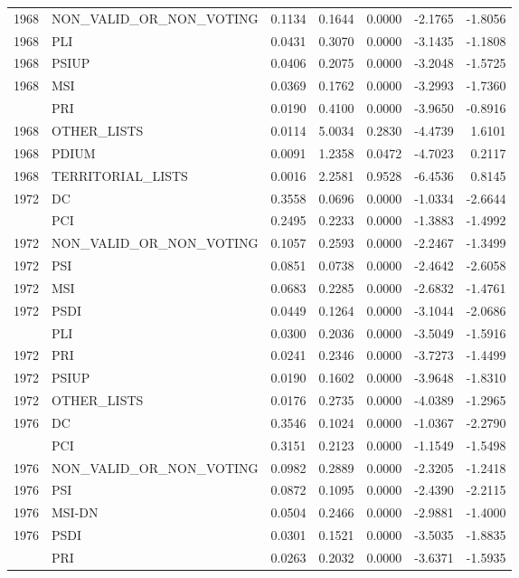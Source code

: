 \begin{longtable}[t]{rlrrrrr}
1968 & NON\_VALID\_OR\_NON\_VOTING & 0.1134 & 0.1644 & 0.0000 & -2.1765 & -1.8056\\
1968 & PLI & 0.0431 & 0.3070 & 0.0000 & -3.1435 & -1.1808\\
1968 & PSIUP & 0.0406 & 0.2075 & 0.0000 & -3.2048 & -1.5725\\
1968 & MSI & 0.0369 & 0.1762 & 0.0000 & -3.2993 & -1.7360\\
\addlinespace
1968 & PRI & 0.0190 & 0.4100 & 0.0000 & -3.9650 & -0.8916\\
1968 & OTHER\_LISTS & 0.0114 & 5.0034 & 0.2830 & -4.4739 & 1.6101\\
1968 & PDIUM & 0.0091 & 1.2358 & 0.0472 & -4.7023 & 0.2117\\
1968 & TERRITORIAL\_LISTS & 0.0016 & 2.2581 & 0.9528 & -6.4536 & 0.8145\\
1972 & DC & 0.3558 & 0.0696 & 0.0000 & -1.0334 & -2.6644\\
\addlinespace
1972 & PCI & 0.2495 & 0.2233 & 0.0000 & -1.3883 & -1.4992\\
1972 & NON\_VALID\_OR\_NON\_VOTING & 0.1057 & 0.2593 & 0.0000 & -2.2467 & -1.3499\\
1972 & PSI & 0.0851 & 0.0738 & 0.0000 & -2.4642 & -2.6058\\
1972 & MSI & 0.0683 & 0.2285 & 0.0000 & -2.6832 & -1.4761\\
1972 & PSDI & 0.0449 & 0.1264 & 0.0000 & -3.1044 & -2.0686\\
\addlinespace
1972 & PLI & 0.0300 & 0.2036 & 0.0000 & -3.5049 & -1.5916\\
1972 & PRI & 0.0241 & 0.2346 & 0.0000 & -3.7273 & -1.4499\\
1972 & PSIUP & 0.0190 & 0.1602 & 0.0000 & -3.9648 & -1.8310\\
1972 & OTHER\_LISTS & 0.0176 & 0.2735 & 0.0000 & -4.0389 & -1.2965\\
1976 & DC & 0.3546 & 0.1024 & 0.0000 & -1.0367 & -2.2790\\
\addlinespace
1976 & PCI & 0.3151 & 0.2123 & 0.0000 & -1.1549 & -1.5498\\
1976 & NON\_VALID\_OR\_NON\_VOTING & 0.0982 & 0.2889 & 0.0000 & -2.3205 & -1.2418\\
1976 & PSI & 0.0872 & 0.1095 & 0.0000 & -2.4390 & -2.2115\\
1976 & MSI-DN & 0.0504 & 0.2466 & 0.0000 & -2.9881 & -1.4000\\
1976 & PSDI & 0.0301 & 0.1521 & 0.0000 & -3.5035 & -1.8835\\
\addlinespace
1976 & PRI & 0.0263 & 0.2032 & 0.0000 & -3.6371 & -1.5935\\

\end{longtable}

